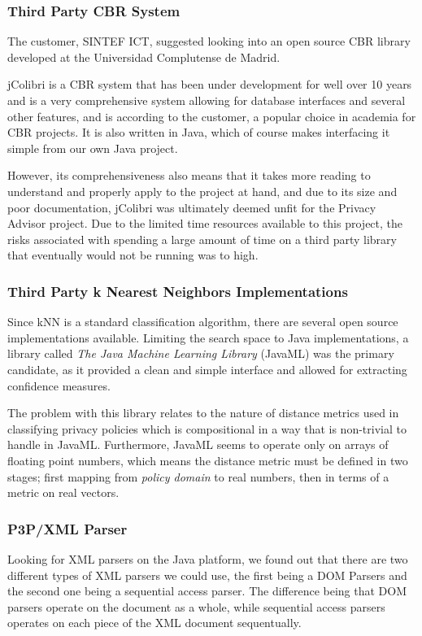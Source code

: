 \subsubsection{Third Party CBR System}

The customer, SINTEF ICT, suggested looking into an open source CBR library developed at the Universidad Complutense de Madrid.
 
jColibri is a CBR system that has been under development for well over 10 years and is a very comprehensive system allowing for database interfaces and several other features,  and is according to the customer, a popular choice in academia for CBR projects. It is also written in Java, which of course makes interfacing it simple from our own Java project.
 
However, its comprehensiveness also means that it takes more reading to understand and properly apply to the project at hand, and due to its size and poor documentation, jColibri was ultimately deemed unfit for the Privacy Advisor project. Due to the limited time resources available to this project, the risks associated with spending a large amount of time on a third party library that eventually would not be running was to high.
 
\subsubsection{Third Party k Nearest Neighbors Implementations}
Since kNN is a standard classification algorithm, there are several open source implementations available. Limiting the search space to Java implementations, a library called \emph{The Java Machine Learning Library} (JavaML) was the primary candidate, as it provided a clean and simple interface and allowed for extracting confidence measures.
 
The problem with this library relates to the nature of distance metrics used in classifying privacy policies which is compositional in a way that is non-trivial to handle in JavaML. Furthermore, JavaML seems to operate only on arrays of floating point numbers, which means the distance metric must be defined in two stages; first mapping from \emph{policy domain} to real numbers, then in terms of a metric on real vectors.

\subsubsection{P3P/XML Parser}
Looking for XML parsers on the Java platform, we found out that there are two different types of XML parsers we could use, the first being a DOM Parsers and the second one being a sequential access parser. The difference being that DOM parsers operate on the document as a whole, while sequential access parsers operates on each piece of the XML document sequentually.

